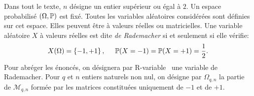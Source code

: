 Dans tout le texte, $n$ désigne un entier supérieur ou égal à $2$.\newline
Un espace probabilisé $(\Omega, \mathbb{P})$ est fixé. Toutes les variables aléatoires considérées sont définies sur cet espace. Elles peuvent être à valeurs réelles ou matricielles. \newline
Une variable aléatoire $X$ à valeurs réelles est dite \emph{de Rademacher} si et seulement si elle vérifie:
\[
 X(\Omega) = \left\lbrace -1, +1\right\rbrace , \hspace{0.5cm} \mathbb{P}(X= -1) = \mathbb{P}(X = +1) = \frac{1}{2}.
\]
Pour abréger les énoncés, on désignera par \og R-variable\fg~ une variable de Rademacher.\newline
Pour $q$ et $n$ entiers naturels non nul, on désigne par $\Omega_{q,n}$ la partie de $\mathcal{M}_{q,n}$ formée par les matrices constituées uniquement de $-1$ et de $+1$.

